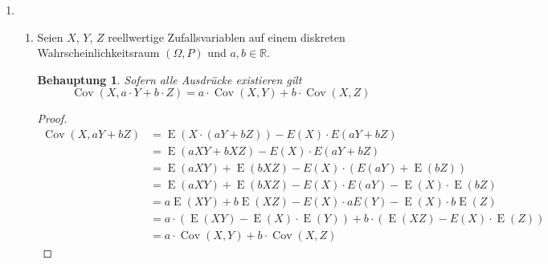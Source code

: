 \documentclass[a4paper]{scrartcl}
\newtheorem*{behaupt}{Behauptung}
\newcommand{\cov}{\operatorname{Cov}}
\newcommand{\e}{\operatorname{E}}
\begin{document}
\begin{enumerate}[label=\bfseries\arabic*.]
    \item
        \begin{enumerate}[label=(\alph*)]
            \item
                Seien $X$, $Y$, $Z$ reellwertige Zufallsvariablen auf einem
                diskreten Wahrscheinlichkeitsraum $(\Omega, P)$ und
                $a, b \in \mathbb{R}$.
                \begin{behaupt}
                    Sofern alle Ausdrücke existieren gilt
                    \begin{equation*}
                        \cov(X, a \cdot Y + b \cdot Z)
                        = a \cdot \cov(X, Y) + b \cdot \cov(X, Z)
                    \end{equation*}
                \end{behaupt}
                \begin{proof}
                    \begin{equation*}
                        \begin{split}
                            \cov(X, aY + bZ)
                            &= \e(X \cdot (aY + bZ)) - E(X) \cdot E(aY + bZ) \\
                            &= \e(aXY + bXZ) - E(X) \cdot E(aY + bZ) \\
                            &= \e(aXY) + \e(bXZ) - E(X)
                               \cdot (E(aY) + \e(bZ)) \\
                            &= \e(aXY) + \e(bXZ) - E(X)
                               \cdot E(aY) - \e(X) \cdot \e(bZ) \\
                            &= a\e(XY) + b\e(XZ) - E(X)
                               \cdot aE(Y) - \e(X) \cdot b\e(Z) \\
                            &= a \cdot (\e(XY) - \e(X) \cdot \e(Y))
                               + b \cdot (\e(XZ) - E(X) \cdot \e(Z)) \\
                            &= a \cdot \cov(X, Y) + b \cdot \cov(X, Z)
                        \end{split}
                    \end{equation*}
                \end{proof}


\end{enumerate}
\end{enumerate}
\end{document}
